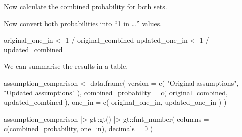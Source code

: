 \documentclass[
  letterpaper,
  DIV=11,
  numbers=noendperiod]{scrreprt}
\newenvironment{Shaded}{\begin{snugshade}}{\end{snugshade}}
\newcommand{\AttributeTok}[1]{\textcolor[rgb]{0.40,0.45,0.13}{#1}}
\newcommand{\DecValTok}[1]{\textcolor[rgb]{0.68,0.00,0.00}{#1}}
\newcommand{\FunctionTok}[1]{\textcolor[rgb]{0.28,0.35,0.67}{#1}}
\newcommand{\NormalTok}[1]{\textcolor[rgb]{0.00,0.23,0.31}{#1}}
\newcommand{\OtherTok}[1]{\textcolor[rgb]{0.00,0.23,0.31}{#1}}
\newcommand{\SpecialCharTok}[1]{\textcolor[rgb]{0.37,0.37,0.37}{#1}}
\newcommand{\StringTok}[1]{\textcolor[rgb]{0.13,0.47,0.30}{#1}}
\begin{document}
Now calculate the combined probability for both sets.

\begin{Shaded}
\end{Shaded}

Now convert both probabilities into ``1 in \ldots'' values.

\begin{Shaded}
\begin{Highlighting}[]
\NormalTok{original\_one\_in }\OtherTok{\textless{}{-}} \DecValTok{1} \SpecialCharTok{/}\NormalTok{ original\_combined}
\NormalTok{updated\_one\_in }\OtherTok{\textless{}{-}} \DecValTok{1} \SpecialCharTok{/}\NormalTok{ updated\_combined}
\end{Highlighting}
\end{Shaded}

We can summarise the results in a table.

\begin{Shaded}
\begin{Highlighting}[]
\NormalTok{assumption\_comparison }\OtherTok{\textless{}{-}} \FunctionTok{data.frame}\NormalTok{(}
  \AttributeTok{version =} \FunctionTok{c}\NormalTok{(}
    \StringTok{"Original assumptions"}\NormalTok{,}
    \StringTok{"Updated assumptions"}
\NormalTok{  ),}
  \AttributeTok{combined\_probability =} \FunctionTok{c}\NormalTok{(}
\NormalTok{    original\_combined,}
\NormalTok{    updated\_combined}
\NormalTok{  ),}
  \AttributeTok{one\_in =} \FunctionTok{c}\NormalTok{(}
\NormalTok{    original\_one\_in,}
\NormalTok{    updated\_one\_in}
\NormalTok{  )}
\NormalTok{)}

\NormalTok{assumption\_comparison }\SpecialCharTok{|\textgreater{}}
\NormalTok{  gt}\SpecialCharTok{::}\FunctionTok{gt}\NormalTok{() }\SpecialCharTok{|\textgreater{}}
\NormalTok{  gt}\SpecialCharTok{::}\FunctionTok{fmt\_number}\NormalTok{(}
    \AttributeTok{columns =} \FunctionTok{c}\NormalTok{(combined\_probability, one\_in),}
    \AttributeTok{decimals =} \DecValTok{0}
\NormalTok{  )}
\end{Highlighting}
\end{Shaded}
\end{document}
